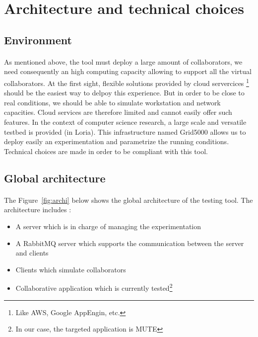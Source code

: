 \documentclass[twoside,twocolumn]{article}
\begin{document}

\section{Architecture and technical choices}

\subsection{Environment}
\paragraph{}
As mentioned above, the tool must deploy a large amount of collaborators, we need consequently an high computing capacity allowing to support all the virtual collaborators.
At the first sight, flexible solutions provided by cloud servercices \footnote{Like AWS, Google AppEngin, etc.} should be the easiest way to delpoy this experience.
But in order to be close to real conditions, we should be able to simulate workstation and network capacities. Cloud services are therefore limited and cannot easily offer such features.
In the context of computer science research, a large scale and versatile testbed is provided (in Loria).
This infrastructure named Grid5000 allows us to deploy easily an experimentation and parametrize the running conditions.
Technical choices are made in order to be compliant with this tool.

\subsection{Global architecture}
\paragraph{}
The Figure~\ref{fig:archi} below shows the global architecture of the testing tool. The architecture includes :

\begin{itemize}
  \item A server which is in charge of managing the experimentation
  \item A RabbitMQ server which supports the communication between the server and clients
  \item Clients which simulate collaborators
  \item Collaborative application which is currently tested\footnote{In our case, the targeted application is MUTE}
\end{itemize}
\end{document}
